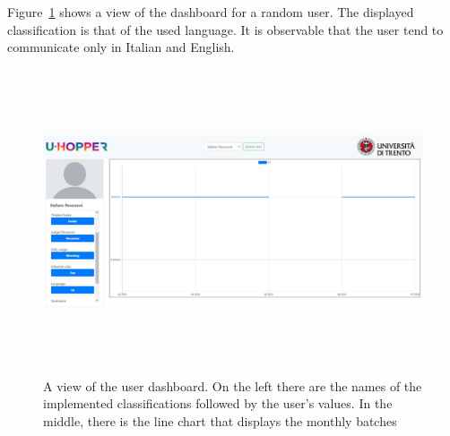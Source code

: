 Figure~\ref{fig:userDash} shows a view of the dashboard for a random user. The displayed classification is that of the used language. It is observable that the user tend to communicate only in Italian and English.

\begin{figure}[htp]
    \centering
    \includegraphics[width=%
    1.0\textwidth,height=9cm]{img/userDash}
    \caption{A view of the user dashboard. On the left there are the names of the implemented classifications followed by the user's values. In the middle, there is the line chart that displays the monthly batches}
    \label{fig:userDash}
\end{figure}